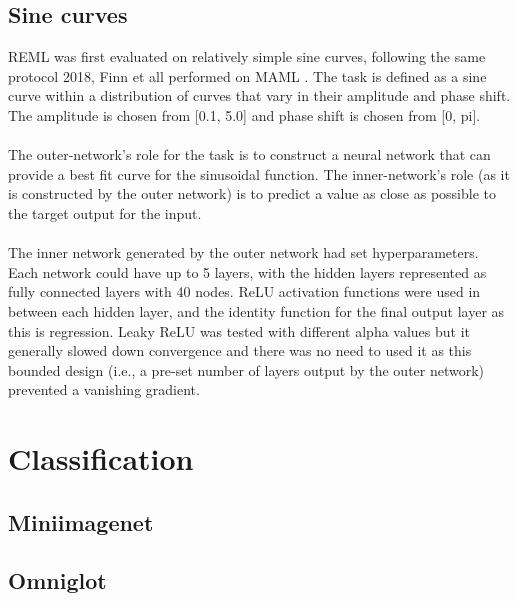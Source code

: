\subsection{Sine curves}
REML was first evaluated on relatively simple sine curves, following the same
protocol 2018, Finn et all performed on MAML \cite{FinAbbLev:17}. 
The task is defined as a sine curve within a distribution of curves that vary in 
their amplitude and phase shift. The amplitude is chosen from [0.1, 5.0] and 
phase shift is chosen from [0, pi]. 
\\\\
The outer-network's role for the task is to construct a neural network
that can provide a best fit curve for the sinusoidal function. The inner-network's
role (as it is constructed by the outer network) is to predict a value as close
as possible to the target output for the input.
\\\\
The inner network generated by the outer network had set hyperparameters. Each
network could have up to 5 layers, with the hidden layers represented as fully
connected layers with 40 nodes. ReLU activation functions were used in between
each hidden layer, and the identity function for the final output layer as 
this is regression. Leaky ReLU was tested with different alpha values but
it generally slowed down convergence and there was no need to used it as 
this bounded design (i.e., a pre-set number of layers output by the outer
network) prevented a vanishing gradient.
\section{Classification}
\subsection{Miniimagenet}
\subsection{Omniglot}

\minitoc 